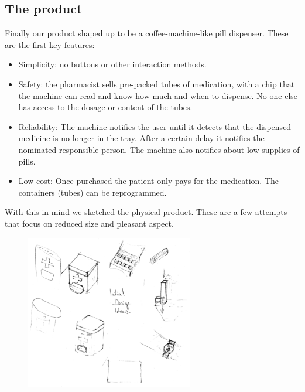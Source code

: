 \documentclass{article}
\begin{document}
	\subsection{The product}
	Finally our product shaped up to be a coffee-machine-like pill dispenser. These are the first key features:
	\begin{itemize}
	\item Simplicity: no buttons or other interaction methods.
	\item Safety: the pharmacist sells pre-packed tubes of medication, with a chip that the machine can read and know how much and when to dispense. No one else has access to the dosage or content of the tubes.
	\item Reliability: The machine notifies the user until it detects that the dispensed medicine is no longer in the tray. After a certain delay it notifies the nominated responsible person. The machine also notifies about low supplies of pills.
	\item Low cost: Once purchased the patient only pays for the medication. The containers (tubes) can be reprogrammed.
	\end{itemize}
	With this in mind we sketched the physical product. These are a few attempts that focus on reduced size and pleasant aspect.
	\begin{figure}[h]
	\centering
	\includegraphics[width=0.65\textwidth]{product.png}
	\end{figure}
\end{document}
